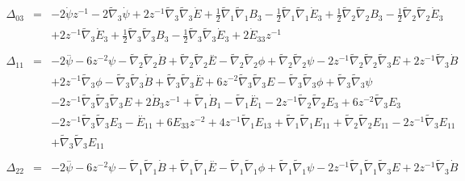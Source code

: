 \documentclass[10pt,letterpaper]{article}
\numberwithin{equation}{section}
\begin{document}
\begin{eqnarray}
\\  \nonumber\\ 
\Delta_{03}&=& -2 \dot{\psi} z^{-1} - 2 \tilde{\nabla}_{3}\dot{\psi} + 2 z^{-1} \tilde{\nabla}_{3}\tilde{\nabla}_{3}\dot{E}+\tfrac{1}{2} \tilde{\nabla}_{1}\tilde{\nabla}_{1}B_{3} -  \tfrac{1}{2} \tilde{\nabla}_{1}\tilde{\nabla}_{1}\dot{E}_{3} + \tfrac{1}{2} \tilde{\nabla}_{2}\tilde{\nabla}_{2}B_{3} -  \tfrac{1}{2} \tilde{\nabla}_{2}\tilde{\nabla}_{2}\dot{E}_{3} \nonumber \\ 
&& + 2 z^{-1} \tilde{\nabla}_{3}\dot{E}_{3} + \tfrac{1}{2} \tilde{\nabla}_{3}\tilde{\nabla}_{3}B_{3} -  \tfrac{1}{2} \tilde{\nabla}_{3}\tilde{\nabla}_{3}\dot{E}_{3}+2 \dot{E}_{33} z^{-1}
\\  \nonumber\\ 
\Delta_{11}&=& -2 \overset{..}{\psi} - 6 z^{-2} \psi -  \tilde{\nabla}_{2}\tilde{\nabla}_{2}\dot{B} + \tilde{\nabla}_{2}\tilde{\nabla}_{2}\overset{..}{E} -  \tilde{\nabla}_{2}\tilde{\nabla}_{2}\phi + \tilde{\nabla}_{2}\tilde{\nabla}_{2}\psi - 2 z^{-1} \tilde{\nabla}_{2}\tilde{\nabla}_{2}\tilde{\nabla}_{3}E + 2 z^{-1} \tilde{\nabla}_{3}\dot{B} \nonumber \\ 
&& + 2 z^{-1} \tilde{\nabla}_{3}\phi -  \tilde{\nabla}_{3}\tilde{\nabla}_{3}\dot{B} + \tilde{\nabla}_{3}\tilde{\nabla}_{3}\overset{..}{E} + 6 z^{-2} \tilde{\nabla}_{3}\tilde{\nabla}_{3}E -  \tilde{\nabla}_{3}\tilde{\nabla}_{3}\phi + \tilde{\nabla}_{3}\tilde{\nabla}_{3}\psi \nonumber \\ 
&& - 2 z^{-1} \tilde{\nabla}_{3}\tilde{\nabla}_{3}\tilde{\nabla}_{3}E+2 \dot{B}_{3} z^{-1} + \tilde{\nabla}_{1}\dot{B}_{1} -  \tilde{\nabla}_{1}\overset{..}{E}_{1} - 2 z^{-1} \tilde{\nabla}_{2}\tilde{\nabla}_{2}E_{3} + 6 z^{-2} \tilde{\nabla}_{3}E_{3} \nonumber \\ 
&& - 2 z^{-1} \tilde{\nabla}_{3}\tilde{\nabla}_{3}E_{3}- \overset{..}{E}_{11} + 6 E_{33} z^{-2} + 4 z^{-1} \tilde{\nabla}_{1}E_{13} + \tilde{\nabla}_{1}\tilde{\nabla}_{1}E_{11} + \tilde{\nabla}_{2}\tilde{\nabla}_{2}E_{11} - 2 z^{-1} \tilde{\nabla}_{3}E_{11} \nonumber \\ 
&& + \tilde{\nabla}_{3}\tilde{\nabla}_{3}E_{11}
\\  \nonumber\\ 
\Delta_{22}&=& -2 \overset{..}{\psi} - 6 z^{-2} \psi -  \tilde{\nabla}_{1}\tilde{\nabla}_{1}\dot{B} + \tilde{\nabla}_{1}\tilde{\nabla}_{1}\overset{..}{E} -  \tilde{\nabla}_{1}\tilde{\nabla}_{1}\phi + \tilde{\nabla}_{1}\tilde{\nabla}_{1}\psi - 2 z^{-1} \tilde{\nabla}_{1}\tilde{\nabla}_{1}\tilde{\nabla}_{3}E + 2 z^{-1} \tilde{\nabla}_{3}\dot{B} \nonumber \\ 

\end{eqnarray}
\end{document}
